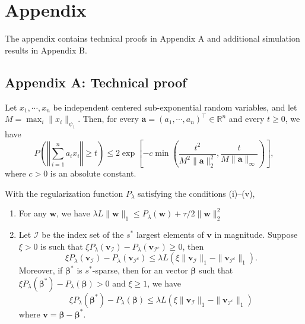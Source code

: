 \documentclass[twoside,12pt]{article}
\newcommand{\mb}[1]{\boldsymbol{\mathbf{#1}}}
\begin{document}
\newpage
\section*{Appendix}
The appendix contains technical proofs in Appendix A and additional simulation results in Appendix B.

\subsection*{Appendix A: Technical proof}

\begin{lemma}
	\label{th: sub-exp}
	Let $x_1,\cdots,x_n$ be independent centered sub-exponential random variables, and let $M=\max_i\|x_i\|_{\psi_1}$. Then, for every $\mb a=(a_1,\cdots,a_n)^\top\in\mathbb{R}^n$ and every $t\geq 0$, we have 
	$$P\left(\left\Vert \sum_{i=1}^na_ix_i\right\Vert\geq t\right)\leq 2\exp\left[-c\min\left(\frac{t^2}{M^2\|\mb a\|_2^2},\frac{t}{M\|\mb a\|_{\infty}}\right)\right],$$
	where $c>0$ is an absolute constant.
\end{lemma}

\begin{lemma}
	\label{th: loh}
	With the regularization function $P_{\lambda}$ satisfying the conditions (i)--(v),
	\begin{enumerate}%
		\item For any $\mb w$, we have $\lambda L\|\mb w\|_1\leq P_{\lambda}(\mb w)+\tau/2 \|\mb w\|_2^2$
		\item Let $\mathcal{I}$ be the index set of the $s^*$ largest elements of $\mb v$ in magnitude.
		Suppose $\xi>0$ is such that $\xi P_{\lambda}(\mb v_{\mathcal I})- P_{\lambda}(\mb v_{\mathcal I^c})\geq0$, then
		$$\xi P_{\lambda}(\mb v_{\mathcal I})- P_{\lambda}(\mb v_{\mathcal I^c})\leq \lambda L\left(\xi\|\mb v_{\mathcal I}\|_1-\|\mb v_{\mathcal I^c}\|_1\right).$$
  Moreover, if $\mb\beta^*$ is $s^*$-sparse, then for an vector ${\mb\beta}$ such that $\xi P_{\lambda}(\mb\beta^*)-P_{\lambda}(\mb\beta)>0$ and $\xi\geq 1$, we have
  $$\xi P_{\lambda}(\mb\beta^*)-P_{\lambda}(\mb\beta)\leq \lambda L(\xi\|\mb v_{\mathcal I}\|_1-\|\mb v_{\mathcal I^c}\|_1)$$
  where $\mb v=\mb\beta-\mb\beta^*$.
	\end{enumerate}
\end{lemma}

\vskip4mm
\end{document}
